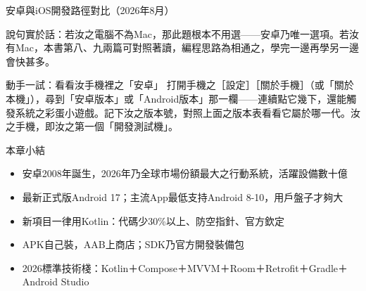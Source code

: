 \begin{center}\small\color{gray}安卓與iOS開發路徑對比（2026年8月）\end{center}

說句實於話：若汝之電腦不為Mac，那此題根本不用選——安卓乃唯一選項。若汝有Mac，本書第八、九兩篇可對照著讀，編程思路為相通之，學完一邊再學另一邊會快甚多。

\begin{tcbpractice}{動手一試：看看汝手機裡之「安卓」}
打開手機之［設定］［關於手機］（或「關於本機」），尋到「安卓版本」或「Android版本」那一欄——連續點它幾下，還能觸發系統之彩蛋小遊戲。記下汝之版本號，對照上面之版本表看看它屬於哪一代。汝之手機，即汝之第一個「開發測試機」。

\end{tcbpractice}

\begin{tcbsummary}{本章小結}
\begin{itemize}
  \item 安卓2008年誕生，2026年乃全球市場份額最大之行動系統，活躍設備數十億
  \item 最新正式版Android 17；主流App最低支持Android 8-10，用戶盤子才夠大
  \item 新項目一律用Kotlin：代碼少30\%以上、防空指針、官方欽定
  \item APK自己裝，AAB上商店；SDK乃官方開發裝備包
  \item 2026標準技術棧：Kotlin＋Compose＋MVVM＋Room＋Retrofit＋Gradle＋Android Studio
\end{itemize}

\end{tcbsummary}
